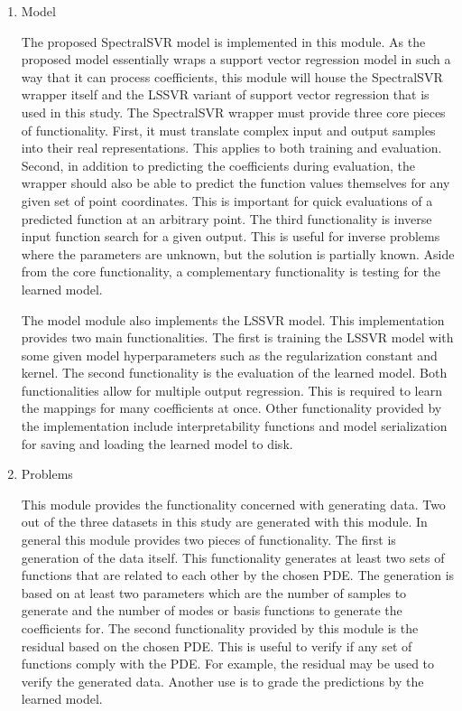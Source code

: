 \begin{enumerate}
  \item Model

        \noindent The proposed SpectralSVR model is implemented in this module. As the proposed model essentially wraps a support vector regression model in such a way that it can process coefficients, this module will house the SpectralSVR wrapper itself and the LSSVR variant of support vector regression that is used in this study. The SpectralSVR wrapper must provide three core pieces of functionality. First, it must translate complex input and output samples into their real representations. This applies to both training and evaluation. Second, in addition to predicting the coefficients during evaluation, the wrapper should also be able to predict the function values themselves for any given set of point coordinates. This is important for quick evaluations of a predicted function at an arbitrary point. The third functionality is inverse input function search for a given output. This is useful for inverse problems where the parameters are unknown, but the solution is partially known. Aside from the core functionality, a complementary functionality is testing for the learned model.

        The model module also implements the LSSVR model. This implementation provides two main functionalities. The first is training the LSSVR model with some given model hyperparameters such as the regularization constant and kernel. The second functionality is the evaluation of the learned model. Both functionalities allow for multiple output regression. This is required to learn the mappings for many coefficients at once. Other functionality provided by the implementation include interpretability functions and model serialization for saving and loading the learned model to disk.

  \item Problems

        \noindent This module provides the functionality concerned with generating data. Two out of the three datasets in this study are generated with this module. In general this module provides two pieces of functionality. The first is generation of the data itself. This functionality generates at least two sets of functions that are related to each other by the chosen PDE\@. The generation is based on at least two parameters which are the number of samples to generate and the number of modes or basis functions to generate the coefficients for. The second functionality provided by this module is the residual based on the chosen PDE\@. This is useful to verify if any set of functions comply with the PDE\@. For example, the residual may be used to verify the generated data. Another use is to grade the predictions by the learned model.

\end{enumerate}

